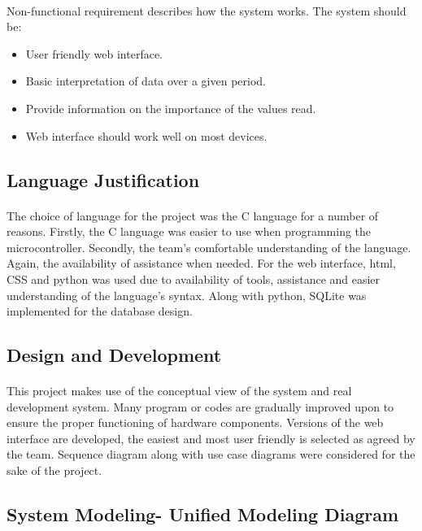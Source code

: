 \documentclass[12pt]{article}
\begin{document}
\paragraph*{}
Non-functional requirement describes how the system works. The 
system should be: 
\begin{itemize}
\item User friendly web interface.
\item Basic interpretation of data over a given period.
\item Provide information on the importance of the values read.
\item Web interface should work well on most devices.
\end{itemize}

\subsection*{Language Justification}
\paragraph*{}
The choice of language for the project was the C language for a number of reasons. Firstly, the C language was easier to use when programming the microcontroller. Secondly, the team’s comfortable understanding of the language. Again, the availability of assistance when needed. For the web interface, html, CSS and python was used due to availability of tools, assistance and easier understanding of the language’s syntax. Along with python, SQLite was implemented for the database design.
\subsection*{Design and Development}
\paragraph*{}
This project makes use of the conceptual view of the system and real development system. Many program or codes are gradually improved upon to ensure the proper functioning of hardware components. Versions of the web interface are developed, the easiest and most user friendly is selected as agreed by the team. Sequence diagram along with use case diagrams were considered for the sake of the project.
\subsection*{System Modeling- Unified Modeling Diagram}
\end{document}
